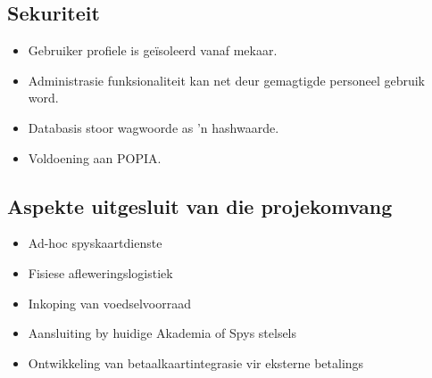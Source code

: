 \subsection{Sekuriteit}
\begin{itemize}
    \item Gebruiker profiele is geïsoleerd vanaf mekaar.
    \item Administrasie funksionaliteit kan net deur gemagtigde personeel gebruik word.
    \item Databasis stoor wagwoorde as 'n hashwaarde.
    \item Voldoening aan \ac{POPIA}.
\end{itemize}

\subsection{Aspekte uitgesluit van die projekomvang}
\begin{itemize}
    \item Ad-hoc spyskaartdienste
    \item Fisiese afleweringslogistiek
    \item Inkoping van voedselvoorraad
    \item Aansluiting by huidige Akademia of Spys stelsels
    \item Ontwikkeling van betaalkaartintegrasie vir eksterne betalings
\end{itemize}

